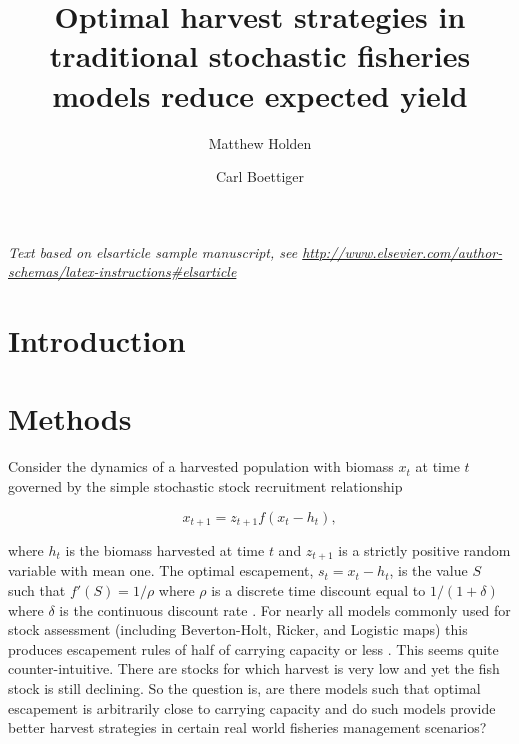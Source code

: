 \documentclass[]{elsarticle} %
\begin{document}
\begin{frontmatter}

  \title{Optimal harvest strategies in traditional stochastic fisheries models reduce expected yield}
    \author[CEED,UQ]{Matthew Holden}
    \author[UCB]{Carl Boettiger}
	\address[CEED]{ARC Centre of Excellence for Environmental Decisions, University of
		Queensland, Brisbane, QLD, 4072, Australia}
    \address[UQ]{Centre for Biodiversity and Conservation Science, University of Queensland, School of Biology, Brisbane, QLD, 4072, Australia}
    \address[UCB]{University of California Berkeley}
  
  \begin{abstract}

  \end{abstract}
  
 \end{frontmatter}

\emph{Text based on elsarticle sample manuscript, see
\url{http://www.elsevier.com/author-schemas/latex-instructions\#elsarticle}}

\section{Introduction}
\section{Methods}
Consider the dynamics of a harvested population with biomass $x_t$ at time $t$ governed by the simple stochastic stock recruitment relationship

\begin{equation}
x_{t+1} = z_{t+1}f(x_t  - h_t),
\end{equation}

where $h_t$ is the biomass harvested at time $t$ and $z_{t+1}$ is a strictly positive random variable with mean one. The optimal escapement, $s_t = x_t  - h_t$, is the value $S$ such that $f'(S)=1/\rho$ where $\rho$ is a discrete time discount equal to $1/(1+\delta)$ where $\delta$ is the continuous discount rate \cite{ref1}. For nearly all models commonly used for stock assessment (including Beverton-Holt, Ricker, and Logistic maps) this produces escapement rules of half of carrying capacity or less \cite{ref2}. This seems quite counter-intuitive. There are stocks for which harvest is very low and yet the fish stock is still declining. So the question is, are there models such that optimal escapement is arbitrarily close to carrying capacity and do such models provide better harvest strategies in certain real world fisheries management scenarios?
\end{document}
